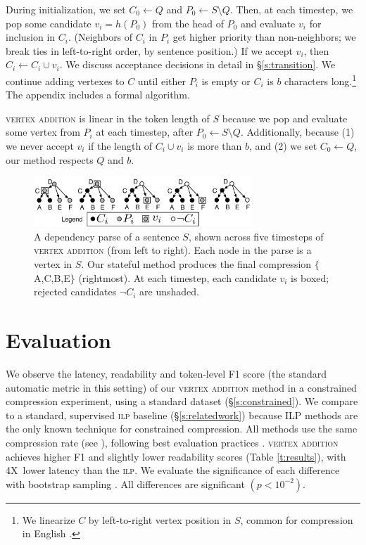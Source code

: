 \documentclass[11pt,a4paper]{article}
\newcommand{\speedup}[0]{4X~}
\begin{document}
During initialization, we set $C_0 \gets Q$ and $P_0 \gets S \setminus Q$. Then, at each timestep, we pop some candidate $v_i =h(P_0)$ from the head of $P_0$ and evaluate $v_i$ for inclusion in $C_i$. (Neighbors of $C_i$ in $P_i$ get higher priority than non-neighbors; we break ties in left-to-right order, by sentence position.) If we accept $v_i$, then $C_i \gets C_i \cup v_i$. We discuss acceptance decisions in detail in \S\ref{s:transition}. We continue adding vertexes to $C$ until either $P_i$ is empty or $C_i$ is $b$ characters long.\footnote{We linearize $C$ by left-to-right vertex position in $S$, common for compression in English \cite{filippova2013overcoming}.} The appendix includes a formal algorithm. 

\textsc{vertex addition} is linear in the token length of $S$ because we pop and evaluate some vertex from $P_i$ at each timestep, after $P_0  \gets S \setminus Q$. Additionally, because (1) we never accept $v_i$ if the length of $C_i \cup v_i$ is more than $b$, and (2) we set $C_0 \gets Q$, our method respects $Q$ and $b$.

\begin{figure}[h]
\includegraphics[width=8.2cm]{additive.pdf}
\caption{A dependency parse of a sentence $S$, shown across five timesteps of \textsc{vertex addition} (from left to right). Each node in the parse is a vertex in $S$. Our stateful method produces the final compression $\{$A,C,B,E$\}$ (rightmost). At each timestep, each candidate $v_i$ is boxed; rejected candidates $\neg C_i$ are unshaded.}
\label{f:walkthru}
\end{figure}

\section{Evaluation}\label{s:autoeval}

We observe the latency, readability and token-level F1 score (the standard automatic metric in this setting)  of our \textsc{vertex addition} method in a constrained compression experiment, using a standard dataset (\S\ref{s:constrained}). We compare to a standard, supervised \textsc{ilp} baseline (\S\ref{s:relatedwork}) because ILP methods are the only known technique for constrained compression. All methods use the same compression rate (see \label{s:constrained}), following best evaluation practices \cite{napoles2011evaluating}. \textsc{vertex addition} achieves higher F1 and slightly lower readability scores (Table \ref{t:results}), with \speedup lower latency  than the \textsc{ilp}. We evaluate the significance of each difference with bootstrap sampling \cite{D12-1091}. All differences are significant {\small $(p < 10^{-2})$}. 
\end{document}
